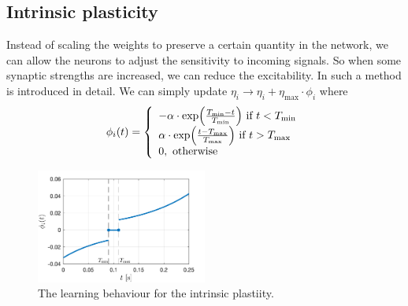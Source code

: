 \subsection{Intrinsic plasticity}
Instead of scaling the weights to preserve a certain quantity in the network, we can allow the neurons to adjust the sensitivity to incoming signals. So when some synaptic strengths are increased, we can reduce the excitability. In \cite{Song2017} such a method is introduced in detail. We can simply update $\eta_{i} \rightarrow \eta_{i} + \eta_{\max } \cdot \phi_{i}$ where 
\begin{align}
\phi_{i} (t) =\left\{\begin{array}{l}-\alpha \cdot \exp \left(\frac{T_{\min }-t}{T_{\rm min }}\right) \text { if } t<T_{ \rm min } \\ \alpha \cdot \exp \left(\frac{t-T_{\rm max }}{T_{\max }}\right) \text { if } t >T_{\rm max } \\ 0, \text { otherwise }\end{array}\right.
\end{align}

\begin{figure}[H]
\centering
\includegraphics[width = 0.5\textwidth]{../Figures/Learning/IPlearningFunction.png}
\caption{The learning behaviour for the intrinsic plastiity.}
\label{fig:IPlearningFunction}
\end{figure}

